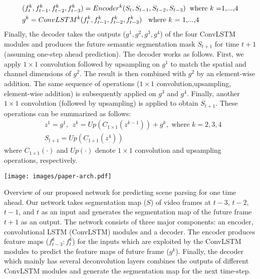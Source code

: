 \documentclass{bmvc2k}
\begin{document}
\begin{equation}\label{eq:overview}
\begin{aligned}
& (f^{k}_{t},f^{k}_{t-1},f^{k}_{t-2},f^{k}_{t-3}) = Encoder^{k}(S_{t}, S_{t-1}, S_{t-2}, S_{t-3}) \hspace{0.2cm} \text{where $k$ =1,...,4}\\
& g^{k} = ConvLSTM^{k}(f^{k}_{t},f^{k}_{t-1},f^{k}_{t-2},f^{k}_{t-3}) \hspace{0.2cm} \text{ where $k$ = 1,...,4}\\
\end{aligned}
\end{equation}%
Finally, the decoder takes the outputs ($g^{1}, g^{2}, g^{3}, g^{4}$) of the four ConvLSTM modules and produces the future semantic segmentation mask $S_{t+1}$ for time $t+1$ (assuming one-step ahead prediction). The decoder works as follows. First, we apply $1\times 1$ convolution followed by upsampling on $g^{1}$ to match the spatial and channel dimensions of $g^{2}$. The result is then combined with $g^{2}$ by an element-wise addition. The same sequence of operations ($1\times 1$ convolution,upsampling, element-wise addition) is subsequently applied on $g^{3}$ and $g^{4}$. Finally, another $1\times 1$ convolution (followed by upsampling) is applied to obtain $S_{t+1}$. These operations can be summarized as follows:
\begin{equation}
  \begin{aligned}
  & z^{1}=g^{1}, \ \  z^{k}=Up(C_{1\times 1}(z^{k-1}))+g^{k}, \textrm{ where } k=2,3,4\\
    & S_{t+1}=Up(C_{1\times 1}(z^{4}))
    \end{aligned}
\end{equation}
where $C_{1\times 1}(\cdot)$ and $Up(\cdot)$ denote $1\times 1$ convolution and upsampling operations, respectively.
\begin{center}
  \texttt{[image: images/paper-arch.pdf]}
\end{center}
   \caption{Overview of our proposed network for predicting scene parsing for one time ahead. Our network takes segmentation map ($S$) of video frames at $t-3$, $t-2$, $t-1$, and $t$ as an input and generates the segmentation map of the future frame $t+1$ as an output. The network consists of three major components: an encoder, convolutional LSTM (ConvLSTM) modules and a decoder. The encoder produces feature maps ($f^{k}_{t-3}:f^{k}_{t}$) for the inputs which are exploited by the ConvLSTM modules to predict the feature maps of future frame ($g^{k}$). Finally, the decoder which mainly has several deconvolution layers combines the outputs of different ConvLSTM modules and generate the segmentation map for the next time-step.}
\end{document}
